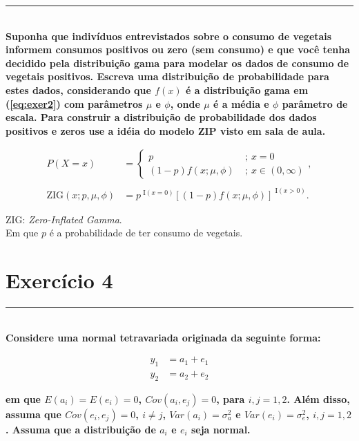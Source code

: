 \documentclass[12pt, oldfontcommands]{article}\usepackage[]{graphicx}\usepackage[]{color}
\newcommand{\horrule}[1]{\rule{\linewidth}{#1}}
\begin{document}
\horrule{1pt} \\

\textbf{Suponha que indivíduos entrevistados sobre o consumo de vegetais
        informem consumos positivos ou zero (sem consumo) e que você tenha
        decidido pela distribuição gama para modelar os dados de consumo
        de vegetais positivos. Escreva uma distribuição de probabilidade
        para estes dados, considerando que \(f(x)\) é a distribuição gama
        em (\ref{eq:exer2}) com parâmetros \(\mu\) e \(\phi\), onde
        \(\mu\) é a média e \(\phi\) parâmetro de escala. Para construir a
        distribuição de probabilidade dos dados positivos e zeros use a
        idéia do modelo ZIP visto em sala de aula.}

\begin{align*}
P(X = x) &= \begin{cases}
             p & \text{ ; } x = 0 \\
             (1 - p) f(x; \mu, \phi) & \text{ ; } x \in (0, \infty)
            \end{cases}, \\
\\
\text{ZIG}(x; p, \mu, \phi) &=
 p^{\text{ I}(x = 0)}
 \left[(1-p) f(x; \mu, \phi)\right]^{\text{ I}(x > 0)}.
\end{align*}

ZIG: \textit{Zero-Inflated Gamma}. \\

Em que \(p\) é a probabilidade de ter consumo de vegetais.

\section*{Exercício 4} 

\horrule{1pt} \\

\textbf{Considere uma normal tetravariada originada da seguinte forma:}

\begin{align}
 \label{eq:exer4}
 y_{1} &= a_{1} + e_{1} \\
 y_{2} &= a_{2} + e_{2} \nonumber
\end{align}

\textbf{em que \(E(a_{i}) = E(e_{i}) = 0\), \(Cov(a_{i}, e_{j}) = 0\),
        para \(i, j = 1, 2\). Além disso, assuma que
        \(Cov(e_{i}, e_{j}) = 0\), \(i \neq j\),
        \(Var(a_{i}) = \sigma_{a}^{2}\) e \(Var(e_{i}) = \sigma_{e}^{2}\),
        \(i, j = 1, 2\). Assuma que a distribuição de \(a_{i}\) e
        \(e_{i}\) seja normal.} 
\end{document}
